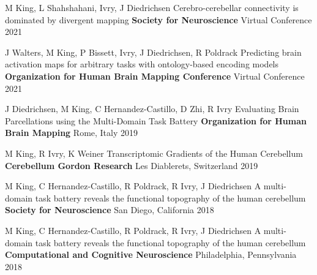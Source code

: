 \begin{cventries}

  \cventry
    {M King, L Shahshahani, Ivry, J Diedrichsen} %
    {Cerebro-cerebellar connectivity is dominated by divergent mapping} %
    {\textbf{Society for Neuroscience}} %
    {Virtual Conference} %
    {2021} %

  \cventry
    {J Walters, M King, P Bissett,  Ivry, J Diedrichsen, R Poldrack} %
    {Predicting brain activation maps for arbitrary tasks with ontology-based encoding models} %
    {\textbf{Organization for Human Brain Mapping Conference}} %
    {Virtual Conference} %
    {2021} %

  \cventry
    {J Diedrichsen, M King, C Hernandez-Castillo, D Zhi, R Ivry} %
    {Evaluating Brain Parcellations using the Multi-Domain Task Battery} %
    {\textbf{Organization for Human Brain Mapping}} %
    {Rome, Italy} %
    {2019} %
    
    
  \cventry
    {M King, R Ivry, K Weiner} %
    {Transcriptomic Gradients of the Human Cerebellum} %
    {\textbf{Cerebellum Gordon Research}} %
    {Les Diablerets, Switzerland} %
    {2019} %
    
  \cventry
    {M King, C Hernandez-Castillo, R Poldrack, R Ivry, J Diedrichsen} %
    {A multi-domain task battery reveals the functional topography of the human cerebellum} %
    {\textbf{Society for Neuroscience}} %
   	{San Diego, California} %
    {2018} %

  \cventry
    {M King, C Hernandez-Castillo, R Poldrack, R Ivry, J Diedrichsen} %
    {A multi-domain task battery reveals the functional topography of the human cerebellum} %
    {\textbf{Computational and Cognitive Neuroscience}} %
    {Philadelphia, Pennsylvania} %
    {2018} %
    

\end{cventries}
